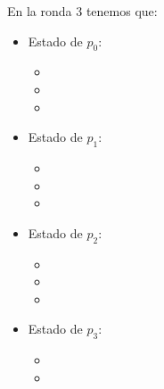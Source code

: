 En la ronda 3 tenemos que:

\begin{multicols}{2}
\begin{itemize}
\item Estado de $p_0$:
      \begin{itemize}
      \item {}
      
      \item {}
      
      \item {}
      \end{itemize}
      
\item Estado de $p_1$:
      \begin{itemize}
      \item {}
      
      \item {}
      
      \item {}
      \end{itemize}

\item Estado de $p_2$:
      \begin{itemize}
      \item {}
      
      \item {}
      
      \item {}
      \end{itemize}

\item Estado de $p_3$:
      \begin{itemize}
      \item {}
      
      \item {}
      

\end{itemize}
\end{itemize}
\end{multicols}
